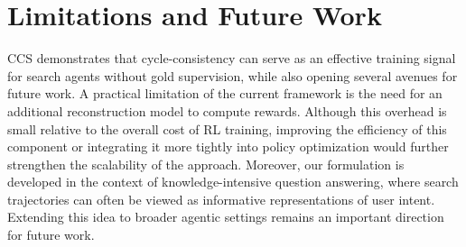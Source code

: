 \section{Limitations and Future Work}
CCS demonstrates that cycle-consistency can serve as an effective training signal for search agents without gold supervision, while also opening several avenues for future work. A practical limitation of the current framework is the need for an additional reconstruction model to compute rewards. Although this overhead is small relative to the overall cost of RL training, improving the efficiency of this component or integrating it more tightly into policy optimization would further strengthen the scalability of the approach. Moreover, our formulation is developed in the context of knowledge-intensive question answering, where search trajectories can often be viewed as informative representations of user intent. Extending this idea to broader agentic settings remains an important direction for future work.



